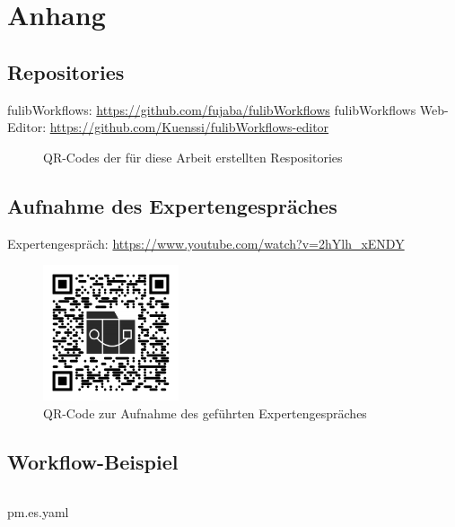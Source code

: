 \chapter*{Anhang}


\section{Repositories}\label{sec:repositories}
fulibWorkflows: \url{https://github.com/fujaba/fulibWorkflows}\newline
fulibWorkflows Web-Editor: \url{https://github.com/Kuenssi/fulibWorkflows-editor}
\begin{figure}[!ht]%
    \centering
    \qquad
    \caption{QR-Codes der für diese Arbeit erstellten Respositories}%
    \label{fig:repos}%
\end{figure}

\section{Aufnahme des Expertengespräches}\label{sec:aufnahme-des-expertengespräches}
Expertengespräch: \url{https://www.youtube.com/watch?v=2hYlh_xENDY}
\begin{figure}[!ht]
    \centering
    \includegraphics[width=4cm,height=4cm]{images/appendix/qr-rec}
    \caption{QR-Code zur Aufnahme des geführten Expertengespräches}
    \label{fig:rec}
\end{figure}

\newpage

\section{Workflow-Beispiel}\label{sec:workflow-beispiel}
\begin{listing}[!ht]
    \inputminted{yaml}{listings/appendix/pm.es.yaml}
    \caption{pm.es.yaml}
    \label{listing:pm-yaml}
\end{listing}
